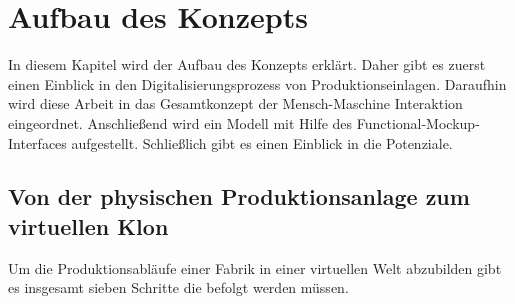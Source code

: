 \chapter{Aufbau des Konzepts}\label{cha:AufbauDesKonzepts}

In diesem Kapitel wird der Aufbau des Konzepts erklärt. Daher gibt es zuerst einen Einblick in den Digitalisierungsprozess von Produktionseinlagen. Daraufhin wird diese Arbeit in das Gesamtkonzept der Mensch-Maschine Interaktion eingeordnet. Anschließend wird ein Modell mit Hilfe des Functional-Mockup-Interfaces aufgestellt. Schließlich gibt es einen Einblick in die Potenziale.

\section{Von der physischen Produktionsanlage zum virtuellen Klon}\label{sec:PhysischZumKlon}

Um die Produktionsabläufe einer Fabrik in einer virtuellen Welt abzubilden gibt es insgesamt sieben Schritte die befolgt werden müssen.

